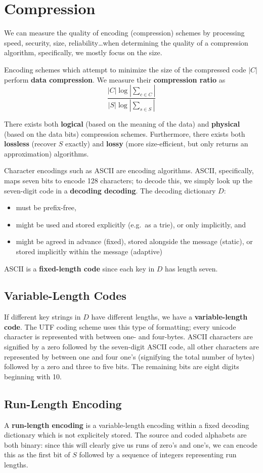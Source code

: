 \documentclass[12pt]{article}
\begin{document}
\section{Compression}
We can measure the quality of encoding (compression) schemes by processing speed, security, size, reliability\dots when determining the quality of a compression algorithm, specifically, we mostly focus on the size.

Encoding schemes which attempt to minimize the size of the compressed code $|C|$ perform {\bf data compression}. We measure their {\bf compression ratio} as \[ \frac{|C| \log |\sum_{c\in C}|}{|S| \log |\sum_{s\in S}|} \]

There exists both {\bf logical} (based on the meaning of the data) and {\bf physical} (based on the data bits) compression schemes. Furthermore, there exists both {\bf lossless} (recover $S$ exactly) and {\bf lossy} (more size-efficient, but only returns an approximation) algorithms.

Character encodings such as ASCII are encoding algorithms. ASCII, specifically, maps seven bits to encode 128 characters; to decode this, we simply look up the seven-digit code in a {\bf decoding decoding}. The decoding dictionary $D$:
\begin{itemize}
\item must be prefix-free,
\item might be used and stored explicitly (e.g.\ as a trie), or only implicitly, and
\item might be agreed in advance (fixed), stored alongside the message (static), or stored implicitly within the message (adaptive)
\end{itemize}
ASCII is a {\bf fixed-length code} since each key in $D$ has length seven.

\subsection{Variable-Length Codes}
If different key strings in $D$ have different lengths, we have a {\bf variable-length code}. The UTF coding scheme uses this type of formatting; every unicode character is represented with between one- and four-bytes. ASCII characters are signified by a zero followed by the seven-digit ASCII code, all other characters are represented by between one and four one's (signifying the total number of bytes) followed by a zero and three to five bits. The remaining bits are eight digits beginning with 10.

\subsection{Run-Length Encoding}
A {\bf run-length encoding} is a variable-length encoding within a fixed decoding dictionary which is not explicitely stored. The source and coded alphabets are both binary: since this will clearly give us runs of zero's and one's, we can encode this as the first bit of $S$ followed by a sequence of integers representing run lengths.
\end{document}
